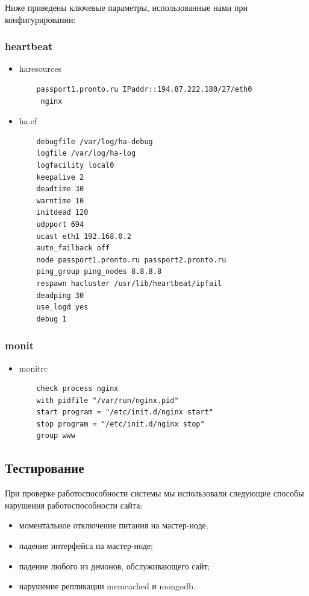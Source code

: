\documentclass[10pt, a5paper]{article}
\begin{document}
Ниже приведены ключевые параметры, использованные нами при конфигурировании:

\subsubsection*{heartbeat}

\begin{itemize}
  \item haresources
\begin{verbatim}
    passport1.pronto.ru IPaddr::194.87.222.180/27/eth0
     nginx
\end{verbatim}
  \item ha.cf
\begin{verbatim}
    debugfile /var/log/ha-debug
    logfile /var/log/ha-log
    logfacility local0
    keepalive 2
    deadtime 30
    warntime 10
    initdead 120
    udpport 694
    ucast eth1 192.168.0.2
    auto_failback off
    node passport1.pronto.ru passport2.pronto.ru
    ping_group ping_nodes 8.8.8.8
    respawn hacluster /usr/lib/heartbeat/ipfail
    deadping 30
    use_logd yes
    debug 1
\end{verbatim}
\end{itemize}
\subsubsection*{monit}

\begin{itemize}
  \item monitrc
\begin{verbatim}
    check process nginx
    with pidfile "/var/run/nginx.pid"
    start program = "/etc/init.d/nginx start"
    stop program = "/etc/init.d/nginx stop"
    group www
\end{verbatim}
\end{itemize}
\subsection*{Тестирование}

При проверке работоспособности системы мы использовали следующие способы нарушения работоспособности сайта:

\begin{itemize}
  \item моментальное отключение питания на мастер-ноде;
  \item падение интерфейса на мастер-ноде;
  \item падение любого из демонов, обслуживающего сайт;
  \item нарушение репликации memcached и mongodb.
\end{itemize}
\end{document}
